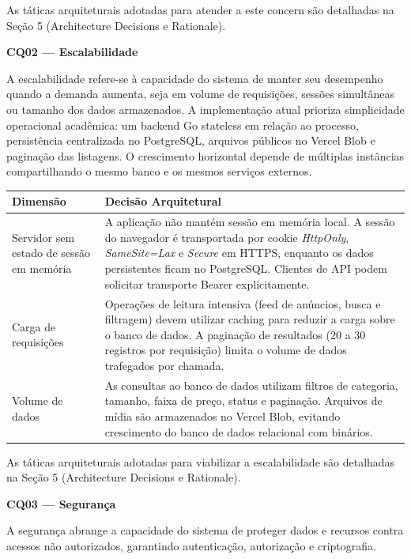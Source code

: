 ﻿\documentclass[12pt,a4paper]{article}
\begin{document}
\noindent As táticas arquiteturais adotadas para atender a este concern são detalhadas na Seção 5 (Architecture Decisions e Rationale).

\vspace{0.5cm}

\noindent\textbf{CQ02 --- Escalabilidade}

A escalabilidade refere-se à capacidade do sistema de manter seu desempenho quando a demanda aumenta, seja em volume de requisições, sessões simultâneas ou tamanho dos dados armazenados. A implementação atual prioriza simplicidade operacional acadêmica: um backend Go stateless em relação ao processo, persistência centralizada no PostgreSQL, arquivos públicos no Vercel Blob e paginação das listagens. O crescimento horizontal depende de múltiplas instâncias compartilhando o mesmo banco e os mesmos serviços externos.

\begin{longtable}{|p{4.5cm}|p{10cm}|}
\hline
\textbf{Dimensão} & \textbf{Decisão Arquitetural} \\
\hline
Servidor sem estado de sessão em memória & A aplicação não mantém sessão em memória local. A sessão do navegador é transportada por cookie \textit{HttpOnly}, \textit{SameSite=Lax} e \textit{Secure} em HTTPS, enquanto os dados persistentes ficam no PostgreSQL. Clientes de API podem solicitar transporte Bearer explicitamente. \\
\hline
Carga de requisições & Operações de leitura intensiva (feed de anúncios, busca e filtragem) devem utilizar caching para reduzir a carga sobre o banco de dados. A paginação de resultados (20 a 30 registros por requisição) limita o volume de dados trafegados por chamada. \\
\hline
Volume de dados & As consultas ao banco de dados utilizam filtros de categoria, tamanho, faixa de preço, status e paginação. Arquivos de mídia são armazenados no Vercel Blob, evitando crescimento do banco de dados relacional com binários. \\
\hline
\end{longtable}

\noindent As táticas arquiteturais adotadas para viabilizar a escalabilidade são detalhadas na Seção 5 (Architecture Decisions e Rationale).

\vspace{0.5cm}

\noindent\textbf{CQ03 --- Segurança}

A segurança abrange a capacidade do sistema de proteger dados e recursos contra acessos não autorizados, garantindo autenticação, autorização e criptografia.
\end{document}
